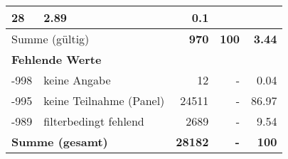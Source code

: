 \begin{longtable}{lXrrr}
       \num{28} &
       \num[round-mode=places,round-precision=2]{2,89} &
         \num[round-mode=places,round-precision=2]{0,1} \\
     \midrule
     \multicolumn{2}{l}{Summe (gültig)} &
       \textbf{\num{970}} &
     \textbf{100} &
       \textbf{\num[round-mode=places,round-precision=2]{3,44}} \\
     \multicolumn{5}{l}{\textbf{Fehlende Werte}}\\
       -998 &
       keine Angabe &
         \num{12} &
        - &
         \num[round-mode=places,round-precision=2]{0,04} \\
       -995 &
       keine Teilnahme (Panel) &
         \num{24511} &
        - &
         \num[round-mode=places,round-precision=2]{86,97} \\
       -989 &
       filterbedingt fehlend &
         \num{2689} &
        - &
         \num[round-mode=places,round-precision=2]{9,54} \\
     \midrule
     \multicolumn{2}{l}{\textbf{Summe (gesamt)}} &
          \textbf{\num{28182}} &
        \textbf{-} &
        \textbf{100} \\
     \bottomrule
     \end{longtable}
     
